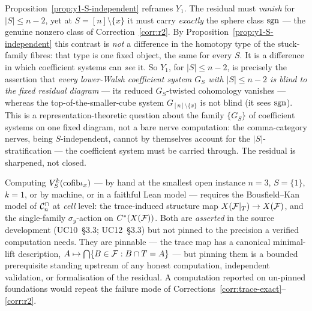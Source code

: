 \begin{remark}
\label{rem:y1-coefficient-blindness}
Proposition~\ref{prop:y1-S-independent} reframes $Y_1$. The residual must
\emph{vanish} for $|S|\le n-2$, yet at $S=[n]\setminus\{x\}$ it must carry
\emph{exactly} the sphere class $\mathrm{sgn}$ --- the genuine nonzero class of
Correction~\ref{corr:r2}. By Proposition~\ref{prop:y1-S-independent} this
contrast is \emph{not} a difference in the homotopy type of the
stuck-family fibres: that type is one fixed object, the same for every
$S$. It is a difference in which coefficient systems can \emph{see} it.
So $Y_1$, for $|S|\le n-2$, is precisely the assertion that \emph{every
lower-Walsh coefficient system $G_S$ with $|S|\le n-2$ is blind to the
fixed residual diagram} --- its reduced $G_S$-twisted cohomology vanishes
--- whereas the top-of-the-smaller-cube system $G_{[n]\setminus\{x\}}$ is
not blind (it sees $\mathrm{sgn}$). This is a representation-theoretic question
about the family $\{G_S\}$ of coefficient systems on one fixed diagram,
not a bare nerve computation: the comma-category nerves, being
$S$-independent, cannot by themselves account for the $|S|$-stratification
--- the coefficient system must be carried through. The residual is
sharpened, not closed.
\end{remark}

\begin{remark}
\label{rem:y1-prerequisite}
Computing $V_{S}^{k}(\mathrm{cofib}\iota_x)$ --- by hand at the smallest open
instance $n=3$, $S=\{1\}$, $k=1$, or by machine, or in a faithful Lean
model --- requires the Bousfield--Kan model of $\mathcal{C}^{\cap}_n$ at \emph{cell} level:
the trace-induced structure map $X(\mathcal{F}|_T)\to X(\mathcal{F})$, and the single-family
$\sigma_y$-action on $C^*(X(\mathcal{F}))$. Both are \emph{asserted} in the source
development (UC10~\S3.3; UC12~\S3.3) but not pinned to the precision a
verified computation needs. They are pinnable --- the trace map has a
canonical minimal-lift description, $A\mapsto\bigcap\{B\in\mathcal{F}:B\cap T=A\}$
--- but pinning them is a bounded prerequisite standing upstream of any
honest computation, independent validation, or formalisation of the
residual. A computation reported on un-pinned foundations would repeat the
failure mode of Corrections~\ref{corr:trace-exact}--\ref{corr:r2}.
\end{remark}

